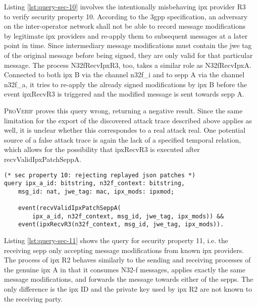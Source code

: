 Listing \ref{lst:query-sec-10} involves the intentionally misbehaving \gls{ipx} provider R3 to verify security property 10.
According to the \gls{3gpp} specification, an adversary on the inter-operator network shall not be able to record message modifications by legitimate \gls{ipx} providers and re-apply them to subsequent messages at a later point in time.
Since intermediary message modifications must contain the \gls{jwe} tag of the original message before being signed, they are only valid for that particular message.
The process {\sffamily N32fRecvIpxR3}, too, takes a similar role as {\sffamily N32fRecvIpxA}.
Connected to both \gls{ipx} B via the channel {\sffamily n32f\_i} and to \gls{sepp} A via the channel {\sffamily n32f\_a}, it tries to re-apply the already signed modifications by \gls{ipx} B before the event {\sffamily ipxRecvR3} is triggered and the modified message is sent towards \gls{sepp} A.

\textsc{ProVerif} proves this query wrong, returning a negative result.
Since the same limitation for the export of the discovered attack trace described above applies as well, it is unclear whether this correspondes to a real attack real.
One potential source of a false attack trace is again the lack of a specified temporal relation, which allows for the possibility that {\sffamily ipxRecvR3} is executed after {\sffamily recvValidIpxPatchSeppA}.

\begin{lstlisting}[caption={Query for security property 10},label={lst:query-sec-10},firstnumber=367]
(* sec property 10: rejecting replayed json patches *)
query ipx_a_id: bitstring, n32f_context: bitstring,
    msg_id: nat, jwe_tag: mac, ipx_mods: ipxmod;

    event(recvValidIpxPatchSeppA(
        ipx_a_id, n32f_context, msg_id, jwe_tag, ipx_mods)) &&
    event(ipxRecvR3(n32f_context, msg_id, jwe_tag, ipx_mods)).
\end{lstlisting}

Listing \ref{lst:query-sec-11} shows the query for security property 11, i.e. the receiving \gls{sepp} only accepting message modifications from known \gls{ipx} providers.
The process of \gls{ipx} R2 behaves similarly to the sending and receiving processes of the genuine \gls{ipx} A in that it consumes N32-f messages, applies exactly the same message modifications, and forwards the message towards either of the \glspl{sepp}.
The only difference is the \gls{ipx} ID and the private key used by \gls{ipx} R2 are not known to the receiving party.

